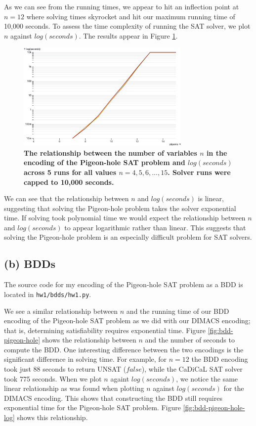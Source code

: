 \documentclass{article}
\newcommand{\code}[1]{\texttt{#1}}
\begin{document}
\medskip
\noindent As we can see from the running times, we appear to hit an inflection point at $n = 12$ where solving times skyrocket and hit our maximum running time of 10,000 seconds. To assess the time complexity of running the SAT solver, we plot $n$ against $log(seconds)$. The results appear in Figure \ref{fig:solver-times-log}.

\begin{figure}[ht]
  \centering
  \includegraphics[width=0.75\textwidth]{pigeon-hole-log}
  \caption{\textbf{The relationship between the number of variables $n$ in the encoding of the Pigeon-hole SAT problem and $log(seconds)$ across 5 runs for all values $n = 4, 5, 6,...,15$. Solver runs were capped to 10,000 seconds.}}
  \label{fig:solver-times-log}
\end{figure}

\medskip
\noindent We can see that the relationship between $n$ and $log(seconds)$ is linear, suggesting that solving the Pigeon-hole problem takes the solver exponential time. If solving took polynomial time we would expect the relationship between $n$ and $log(seconds)$ to appear logarithmic rather than linear. This suggests that solving the Pigeon-hole problem is an especially difficult problem for SAT solvers.

\subsection{(b) BDDs}

\noindent The source code for my encoding of the Pigeon-hole SAT problem as a BDD is located in \code{hw1/bdds/hw1.py}.

\medskip
\noindent We see a similar relationship between $n$ and the running time of our BDD encoding of the Pigeon-hole SAT problem as we did with our DIMACS encoding; that is, determining satisfiability requires exponential time. Figure \ref{fig:bdd-pigeon-hole} shows the relationship between $n$ and the number of seconds to compute the BDD. One interesting difference between the two encodings is the significant difference in solving time. For example, for $n=12$ the BDD encoding took just 88 seconds to return UNSAT ($false$), while the CaDiCaL SAT solver took 775 seconds. When we plot $n$ againt $log(seconds)$, we notice the same linear relationship as was found when plotting $n$ against $log(seconds)$ for the DIMACS encoding. This shows that constructing the BDD still requires exponential time for the Pigeon-hole SAT problem. Figure \ref{fig:bdd-pigeon-hole-log} shows this relationship.
\end{document}
